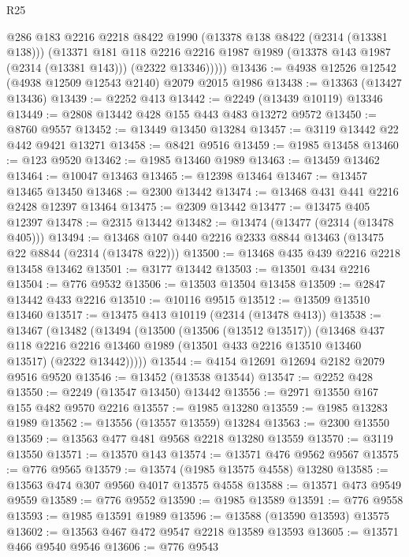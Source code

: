 \begin{lexlean}{R25}
\begin{coremodule}
          @286
          @183
          @2216
          @2218
          @8422
          @1990
          (@13378 @138 @8422 (@2314 (@13381 @138)))
          (@13371
            @181
            @118
            @2216
            @2216
            @1987
            @1989
            (@13378 @143 @1987 (@2314 (@13381 @143)))
            (@2322 @13346)))))
@13436 := @4938 @12526 @12542 (@4938 @12509 @12543 @2140) @2079 @2015 @1986
@13438 := @13363 (@13427 @13436)
@13439 := @2252 @413
@13442 := @2249 (@13439 @10119) @13346
@13449 := @2808 @13442 @428 @155 @443 @483 @13272 @9572
@13450 := @8760 @9557
@13452 := @13449 @13450 @13284
@13457 := @3119 @13442 @22 @442 @9421 @13271
@13458 := @8421 @9516
@13459 := @1985 @13458
@13460 := @123 @9520
@13462 := @1985 @13460 @1989
@13463 := @13459 @13462
@13464 := @10047 @13463
@13465 := @12398 @13464
@13467 := @13457 @13465 @13450
@13468 := @2300 @13442
@13474 := @13468 @431 @441 @2216 @2428 @12397 @13464
@13475 := @2309 @13442
@13477 := @13475 @405 @12397
@13478 := @2315 @13442
@13482 := @13474 (@13477 (@2314 (@13478 @405)))
@13494 := @13468 @107 @440 @2216 @2333 @8844 @13463 (@13475 @22 @8844 (@2314 (@13478 @22)))
@13500 := @13468 @435 @439 @2216 @2218 @13458 @13462
@13501 := @3177 @13442
@13503 := @13501 @434 @2216
@13504 := @776 @9532
@13506 := @13503 @13504 @13458
@13509 := @2847 @13442 @433 @2216
@13510 := @10116 @9515
@13512 := @13509 @13510 @13460
@13517 := @13475 @413 @10119 (@2314 (@13478 @413))
@13538 := @13467
    (@13482
      (@13494
        (@13500
          (@13506 (@13512 @13517))
          (@13468
            @437
            @118
            @2216
            @2216
            @13460
            @1989
            (@13501 @433 @2216 @13510 @13460 @13517)
            (@2322 @13442)))))
@13544 := @4154 @12691 @12694 @2182 @2079 @9516 @9520
@13546 := @13452 (@13538 @13544)
@13547 := @2252 @428
@13550 := @2249 (@13547 @13450) @13442
@13556 := @2971 @13550 @167 @155 @482 @9570 @2216
@13557 := @1985 @13280
@13559 := @1985 @13283 @1989
@13562 := @13556 (@13557 @13559) @13284
@13563 := @2300 @13550
@13569 := @13563 @477 @481 @9568 @2218 @13280 @13559
@13570 := @3119 @13550
@13571 := @13570 @143
@13574 := @13571 @476 @9562 @9567
@13575 := @776 @9565
@13579 := @13574 (@1985 @13575 @4558) @13280
@13585 := @13563 @474 @307 @9560 @4017 @13575 @4558
@13588 := @13571 @473 @9549 @9559
@13589 := @776 @9552
@13590 := @1985 @13589
@13591 := @776 @9558
@13593 := @1985 @13591 @1989
@13596 := @13588 (@13590 @13593) @13575
@13602 := @13563 @467 @472 @9547 @2218 @13589 @13593
@13605 := @13571 @466 @9540 @9546
@13606 := @776 @9543

\end{coremodule}
\end{lexlean}
